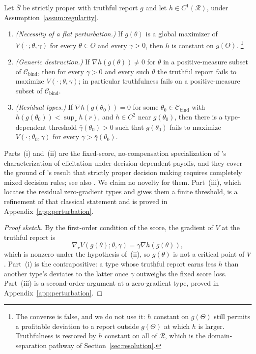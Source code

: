\documentclass[acmsmall,nonacm,screen]{acmart}
\theoremstyle{acmplain}%
\theoremstyle{acmdefinition}%
\newcommand{\calR}{\mathcal{R}}
\newcommand{\Cbind}{\mathcal{C}_{\mathrm{bind}}}
\newcommand{\Sbar}{\bar{S}}
\numberwithin{equation}{section}
\begin{document}
\begin{lemma}\label{lem:perturbation}
Let $\Sbar$ be strictly proper with truthful report $g$ and let $h \in C^1(\calR)$, under Assumption~\ref{assum:regularity}.
\begin{enumerate}
\item[(i)] \emph{(Necessity of a flat perturbation.)} If $g(\theta)$ is a global maximizer of $V(\cdot\,;\theta,\gamma)$ for every $\theta \in \Theta$ and every $\gamma > 0$, then $h$ is constant on $g(\Theta)$.%
\footnote{The converse is false, and we do not use it: $h$ constant on $g(\Theta)$ still permits a profitable deviation to a report outside $g(\Theta)$ at which $h$ is larger. Truthfulness is restored by $h$ constant on all of $\calR$, which is the domain-separation pathway of Section~\ref{sec:resolution}.}

\item[(ii)] \emph{(Generic destruction.)} If $\nabla h(g(\theta)) \neq 0$ for $\theta$ in a positive-measure subset of $\Cbind$, then for every $\gamma > 0$ and every such $\theta$ the truthful report fails to maximize $V(\cdot\,;\theta,\gamma)$; in particular truthfulness fails on a positive-measure subset of $\Cbind$.

\item[(iii)] \emph{(Residual types.)} If $\nabla h(g(\theta_0)) = 0$ for some $\theta_0 \in \Cbind$ with $h(g(\theta_0)) < \sup_r h(r)$, and $h \in C^2$ near $g(\theta_0)$, then there is a type-dependent threshold $\bar\gamma(\theta_0) > 0$ such that $g(\theta_0)$ fails to maximize $V(\cdot\,;\theta_0,\gamma)$ for every $\gamma > \bar\gamma(\theta_0)$.
\end{enumerate}
Parts~(i) and~(ii) are the fixed-score, no-compensation specialization of \citet{boutilier2012eliciting}'s characterization of elicitation under decision-dependent payoffs, and they cover the ground of \citet{chen2014eliciting}'s result that strictly proper decision making requires completely mixed decision rules; see also \citet{othman2010decision}. We claim no novelty for them. Part~(iii), which locates the residual zero-gradient types and gives them a finite threshold, is a refinement of that classical statement and is proved in Appendix~\ref{app:perturbation}.
\end{lemma}

\begin{proof}[Proof sketch]
By the first-order condition of the score, the gradient of $V$ at the truthful report is
\begin{equation}\label{eq:foc-perturbed}
\nabla_r V(g(\theta);\theta,\gamma) = \gamma \nabla h(g(\theta)),
\end{equation}
which is nonzero under the hypothesis of~(ii), so $g(\theta)$ is not a critical point of $V$. Part~(i) is the contrapositive: a type whose truthful report earns less $h$ than another type's deviates to the latter once $\gamma$ outweighs the fixed score loss. Part~(iii) is a second-order argument at a zero-gradient type, proved in Appendix~\ref{app:perturbation}.
\end{proof}
\end{document}
